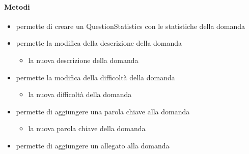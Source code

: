 \paragraph{Metodi}
\begin{itemize}
\item {}
\newline
permette di creare un QuestionStatistics con le statistiche della domanda
\newline
\item {}
\newline
permette la modifica della descrizione della domanda
\newline
{}
\newline
\begin{itemize}
\item {}
\newline
la nuova descrizione della domanda
\end{itemize}
\item {}
\newline
permette la modifica della difficoltà della domanda
\newline
{}
\newline
\begin{itemize}
\item {}
\newline
la nuova difficoltà della domanda
\end{itemize}
\item {}
\newline
permette di aggiungere una parola chiave alla domanda
\newline
{}
\newline
\begin{itemize}
\item {}
\newline
la nuova parola chiave della domanda
\end{itemize}
\item {}
\newline
permette di aggiungere un allegato alla domanda
\newline
{}
\newline
\begin{itemize}

\end{itemize}
\end{itemize}

